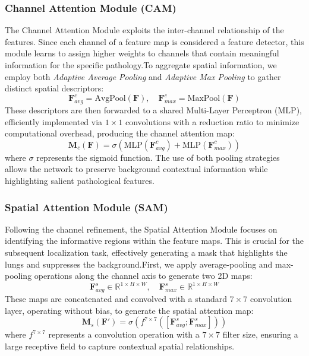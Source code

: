 \documentclass[a4paper,fleqn]{cas-dc}
\begin{document}
\subsubsection{Channel Attention Module (CAM)}The Channel Attention Module exploits the inter-channel relationship of the features. Since each channel of a feature map is considered a feature detector, this module learns to assign higher weights to channels that contain meaningful information for the specific pathology.To aggregate spatial information, we employ both \textit{Adaptive Average Pooling} and \textit{Adaptive Max Pooling} to gather distinct spatial descriptors:$$\mathbf{F}_{avg}^c = \text{AvgPool}(\mathbf{F}), \quad \mathbf{F}_{max}^c = \text{MaxPool}(\mathbf{F})$$These descriptors are then forwarded to a shared Multi-Layer Perceptron (MLP), efficiently implemented via $1 \times 1$ convolutions with a reduction ratio to minimize computational overhead, producing the channel attention map:$$\mathbf{M}_c(\mathbf{F}) = \sigma(\text{MLP}(\mathbf{F}_{avg}^c) + \text{MLP}(\mathbf{F}_{max}^c))$$where $\sigma$ represents the sigmoid function. The use of both pooling strategies allows the network to preserve background contextual information while highlighting salient pathological features.

\subsubsection{Spatial Attention Module (SAM)}Following the channel refinement, the Spatial Attention Module focuses on identifying the informative regions within the feature maps. This is crucial for the subsequent localization task, effectively generating a mask that highlights the lungs and suppresses the background.First, we apply average-pooling and max-pooling operations along the channel axis to generate two 2D maps:$$\mathbf{F}_{avg}^s \in \mathbb{R}^{1 \times H \times W}, \quad \mathbf{F}_{max}^s \in \mathbb{R}^{1 \times H \times W}$$These maps are concatenated and convolved with a standard $7 \times 7$ convolution layer, operating without bias, to generate the spatial attention map:$$\mathbf{M}_s(\mathbf{F}') = \sigma(f^{7 \times 7}([\mathbf{F}_{avg}^s; \mathbf{F}_{max}^s]))$$where $f^{7 \times 7}$ represents a convolution operation with a $7 \times 7$ filter size, ensuring a large receptive field to capture contextual spatial relationships.
\end{document}
